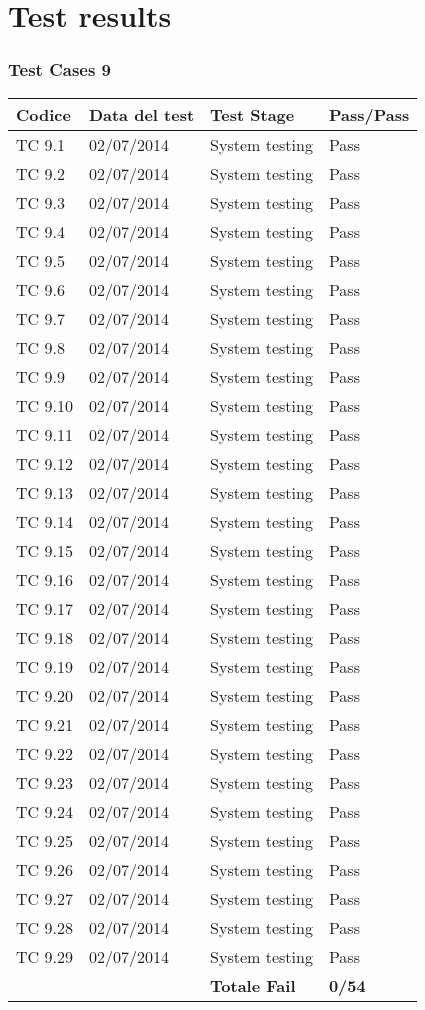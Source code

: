 \chapter{Test results}

\subsection{Test Cases 9}

\begin{longtable}{|p{3cm}|p{3cm}|p{3cm}|p{3cm}|}
	\hline
	\rowcolor{Gray}
	\textbf{Codice} & \textbf{Data del test} & \textbf{Test Stage} & \textbf{Pass/Pass}\tabularnewline
	\hline
	TC 9.1			& 02/07/2014 			& System testing		& Pass \tabularnewline
	\hline
	TC 9.2			& 02/07/2014 			& System testing		& Pass \tabularnewline
	\hline
	TC 9.3			& 02/07/2014 			& System testing		& Pass \tabularnewline
	\hline
	TC 9.4			& 02/07/2014 			& System testing		& Pass \tabularnewline
	\hline
	TC 9.5			& 02/07/2014 			& System testing		& Pass \tabularnewline
	\hline
	TC 9.6			& 02/07/2014 			& System testing		& Pass \tabularnewline
	\hline
	TC 9.7			& 02/07/2014 			& System testing		& Pass \tabularnewline
	\hline
	TC 9.8			& 02/07/2014 			& System testing		& Pass \tabularnewline
	\hline
	TC 9.9			& 02/07/2014 			& System testing		& Pass \tabularnewline
	\hline
	TC 9.10			& 02/07/2014 			& System testing		& Pass \tabularnewline
	\hline
	TC 9.11			& 02/07/2014 			& System testing		& Pass \tabularnewline
	\hline
	TC 9.12			& 02/07/2014 			& System testing		& Pass \tabularnewline
	\hline
	TC 9.13			& 02/07/2014 			& System testing		& Pass \tabularnewline
	\hline
	TC 9.14			& 02/07/2014 			& System testing		& Pass \tabularnewline
	\hline
	TC 9.15			& 02/07/2014 			& System testing		& Pass \tabularnewline
	\hline
	TC 9.16			& 02/07/2014 			& System testing		& Pass \tabularnewline
	\hline
	TC 9.17			& 02/07/2014 			& System testing		& Pass \tabularnewline
	\hline
	TC 9.18			& 02/07/2014 			& System testing		& Pass \tabularnewline
	\hline
	TC 9.19			& 02/07/2014 			& System testing		& Pass \tabularnewline
	\hline
	TC 9.20			& 02/07/2014 			& System testing		& Pass \tabularnewline
	\hline
	TC 9.21			& 02/07/2014 			& System testing		& Pass \tabularnewline
	\hline
	TC 9.22			& 02/07/2014 			& System testing		& Pass \tabularnewline
	\hline
	TC 9.23			& 02/07/2014 			& System testing		& Pass \tabularnewline
	\hline
	TC 9.24			& 02/07/2014 			& System testing		& Pass \tabularnewline
	\hline
	TC 9.25			& 02/07/2014 			& System testing		& Pass \tabularnewline
	\hline
	TC 9.26			& 02/07/2014 			& System testing		& Pass \tabularnewline
	\hline
	TC 9.27			& 02/07/2014 			& System testing		& Pass \tabularnewline
	\hline
	TC 9.28			& 02/07/2014 			& System testing		& Pass \tabularnewline
	\hline
	TC 9.29			& 02/07/2014 			& System testing		& Pass \tabularnewline
	\hline
					& 						& \textbf{Totale Fail}	& \textbf{0/54} \tabularnewline
	\hline
\end{longtable}